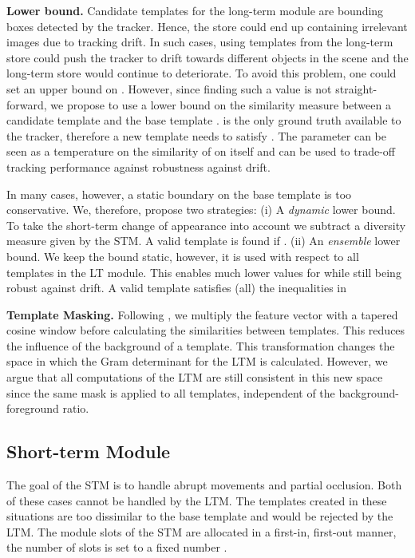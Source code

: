 \documentclass{article}
\begin{document}
\textbf{Lower bound.}
Candidate templates for the long-term module are bounding boxes detected by the tracker. Hence, the store could end up containing irrelevant images due to tracking drift. In such cases, using templates from the long-term store could push the tracker to drift towards different objects in the scene and the long-term store would continue to deteriorate. To avoid this problem, one could set an upper bound on . However, since finding such a value is not straight-forward, we propose to use a lower bound on the similarity measure between a candidate template  and the base template .  is the only ground truth available to the tracker, therefore a new template needs to satisfy . The parameter  can be seen as a temperature on the similarity of  on itself and can be used to trade-off tracking performance against robustness against drift. 

In many cases, however, a static boundary on the base template  is too conservative. We, therefore, propose two strategies: (i) A \textit{dynamic} lower bound. To take the short-term change of appearance into account we subtract a diversity measure  given by the STM. A valid template is found if . (ii) An \textit{ensemble} lower bound. We keep the bound static, however, it is used with respect to all templates in the LT module. This enables much lower values for  while still being robust against drift. A valid template satisfies (all) the inequalities in 

\textbf{Template Masking.}
Following \cite{bolme2010visual}, we multiply the feature vector  with a tapered cosine window before calculating the similarities between templates. This reduces the influence of the background of a template. This transformation changes the space in which the Gram determinant for the LTM is calculated. However, we argue that all computations of the LTM are still consistent in this new space since the same mask is applied to all templates, independent of the background-foreground ratio.



\subsection{Short-term Module}\label{sec:shorttermmodule}
The goal of the STM is to handle abrupt movements and partial occlusion. Both of these cases cannot be handled by the LTM. The templates created in these situations are too dissimilar to the base template and would be rejected by the LTM. The module slots of the STM are allocated in a first-in, first-out manner, the number of slots is set to a fixed number .
\end{document}
